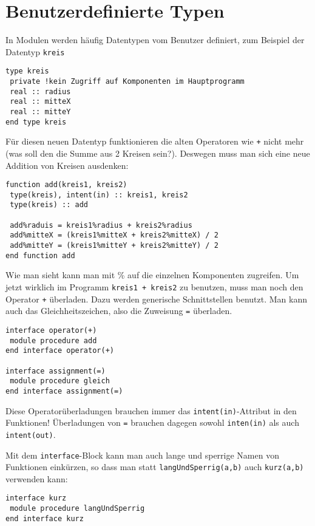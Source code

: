 \section{Benutzerdefinierte Typen}

In Modulen werden häufig Datentypen vom Benutzer definiert, zum Beispiel der Datentyp \texttt{kreis}
\begin{lstlisting}
type kreis
 private !kein Zugriff auf Komponenten im Hauptprogramm
 real :: radius
 real :: mitteX
 real :: mitteY
end type kreis
\end{lstlisting}

Für diesen neuen Datentyp funktionieren die alten Operatoren wie \texttt{+} nicht mehr (was soll den die Summe aus 2 Kreisen sein?). Deswegen muss man sich eine neue Addition von Kreisen ausdenken:
\begin{lstlisting}
function add(kreis1, kreis2)
 type(kreis), intent(in) :: kreis1, kreis2
 type(kreis) :: add
 
 add%raduis = kreis1%radius + kreis2%radius
 add%mitteX = (kreis1%mitteX + kreis2%mitteX) / 2
 add%mitteY = (kreis1%mitteY + kreis2%mitteY) / 2
end function add
\end{lstlisting}

Wie man sieht kann man mit \% auf die einzelnen Komponenten zugreifen. Um jetzt wirklich im Programm \texttt{kreis1 + kreis2} zu benutzen, muss man noch den Operator \texttt{+} überladen. Dazu werden generische Schnittstellen benutzt. Man kann auch das Gleichheitszeichen, also die Zuweisung \texttt{=} überladen.
\begin{lstlisting}
interface operator(+)
 module procedure add
end interface operator(+)

interface assignment(=)
 module procedure gleich
end interface assignment(=)
\end{lstlisting}

Diese Operatorüberladungen brauchen immer das \texttt{intent(in)}-Attribut in den Funktionen! Überladungen von \texttt{=} brauchen dagegen sowohl \texttt{inten(in)} als auch \texttt{intent(out)}.

Mit dem \texttt{interface}-Block kann man auch lange und sperrige Namen von Funktionen einkürzen, so dass man statt \texttt{langUndSperrig(a,b)} auch \texttt{kurz(a,b)} verwenden kann:
\begin{lstlisting}
interface kurz
 module procedure langUndSperrig
end interface kurz
\end{lstlisting}